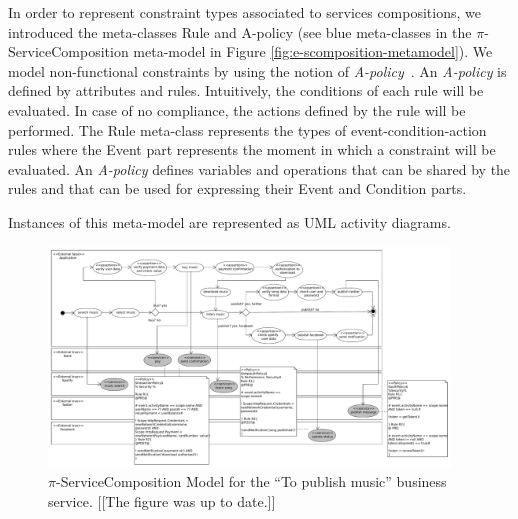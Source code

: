\begin{itemizedTrivlist}
\item In order to represent constraint types associated to services compositions, we introduced the meta-classes {\sc Rule} and {\sc A-policy} (see blue meta-classes in the $\pi$-Serv\-ice\-Com\-po\-si\-tion meta-model in Figure \ref{fig:e-scomposition-metamodel}).
We model non-functional constraints by using the notion of {\em A-policy}~\cite{Espinosa-Oviedo2011a,CIC:eovszmc09c}.
An {\em A-policy} is defined by attributes and rules. 
Intuitively, the conditions of each rule will be evaluated.
In case of no compliance, the actions defined by the rule will be performed.
The {\sc Rule} meta-class represents the types of event-condition-action rules where the {\sc Event} part represents the moment in which a constraint  will be evaluated.
An {\em A-policy} defines variables and operations that can be shared by the rules and that can be used for expressing their Event and Condition parts. 
\end{itemizedTrivlist}
Instances of this meta-model are represented as UML activity diagrams. 
\begin{figure}[t]%
\centering
\includegraphics[width=0.95\textwidth]{figs/piServiceComposition-toPublishMusic}
\caption{$\pi$-ServiceComposition Model for the ``To publish
music'' business service. {\color{blue}[[The figure was up to date.]]}}
\label{fig:servicecompositionmodel}
\end{figure}


